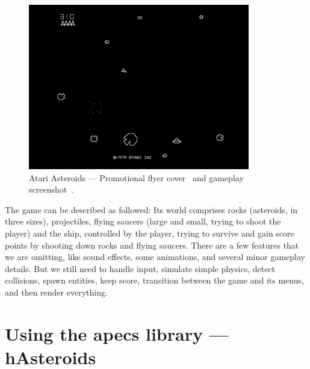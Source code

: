 \documentclass[
  digital, %
  color,   %
  table,   %
  oneside, %
  lof,     %
  lot,     %
]{fithesis3}
\begin{document}
\begin{figure}[H]
\begin{minipage}{0.33\textwidth}
    \end{minipage}
    \hfill
    \begin{minipage}{0.66\textwidth}
        \hfill \includegraphics[height=0.65\textwidth]{images/atariasteroids-screenshot.png}
    \end{minipage}
    \caption{Atari Asteroids --- Promotional flyer cover~\cite{asteroidsflyer}
    and gameplay screenshot~\cite{asteroidsscreenshot}.}
\end{figure}

The game can be described as followed:
 \cite{aboutasteroids}
Its world comprises rocks (asteroids, in three sizes), projectiles,
flying saucers (large and small, trying to shoot the player) and the ship, controlled by the player,
trying to survive and gain score points by shooting down rocks and flying saucers.
There are a few features that we are omitting, like sound effects, some animations,
and several minor gameplay details. But we still need to handle input, simulate simple physics,
detect collisions, spawn entities, keep score, transition between the game
and its menus, and then render everything.



\chapter{Using the apecs library --- hAsteroids}
\label{chptr:hasteroids}
\end{document}
